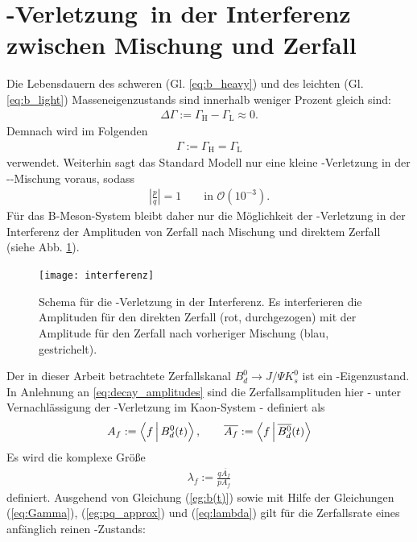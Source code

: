 \section[\CP-Verletzung in der Interferenz zwischen Mischung und Zerfall]{\boldmath\CP-Verletzung\ \unboldmath in der Interferenz zwischen Mischung und Zerfall}
Die Lebensdauern des schweren (Gl. \ref{eq:b_heavy}) und des leichten (Gl. \ref{eq:b_light}) Masseneigenzustands sind innerhalb weniger Prozent gleich sind:
\begin{align}
\Delta \Gamma := \Gamma_{\text{H}} - \Gamma_{\text{L}} \approx 0.
\end{align}
Demnach wird im Folgenden 
\begin{align}
\Gamma := \Gamma_{\text{H}} = \Gamma_{\text{L}} \label{eq:Gamma}
\end{align}
verwendet. Weiterhin sagt das Standard Modell nur eine kleine \CP-Verletzung in der \Bd-\Bdbar-Mischung voraus, sodass
\begin{align}
\left|\frac{p}{q}\right| = 1 \qquad \text{in } \mathcal{O}(10^{-3}). \label{eg:pq_approx}
\end{align}
Für das B-Meson-System bleibt daher nur die Möglichkeit der \CP-Verletzung in der Interferenz der Amplituden von Zerfall nach Mischung und direktem Zerfall (siehe Abb. \ref{fig:interferenz}). 
\begin{figure}[hptb]
\centering
\texttt{[image: interferenz]}
\caption{Schema für die \CP-Verletzung in der Interferenz. Es interferieren die Amplituden für den direkten Zerfall (rot, durchgezogen) mit der Amplitude für den Zerfall nach vorheriger Mischung (blau, gestrichelt).}
\label{fig:interferenz}
\end{figure}
Der in dieser Arbeit betrachtete Zerfallskanal $B_d^0 \rightarrow J/\Psi K_s^0$ ist ein \CP-Eigenzustand. In Anlehnung an \ref{eq:decay_amplitudes} sind die Zerfallsamplituden hier - unter Vernachlässigung der \CP-Verletzung im Kaon-System - definiert als
\begin{align}
\nonumber A_f := \Braket{f|\text{\Bd}(t)\vphantom{\text{\Bdbar}}}, \qquad \overline{A_{f}} := \Braket{f|\text{\Bdbar}(t)}
\end{align}
Es wird die komplexe Größe
\begin{align}
\lambda_f := \frac{q\overline{A_f}}{pA_f} \label{eq:lambda}
\end{align}
definiert. Ausgehend von Gleichung (\ref{eg:b(t)}) sowie mit Hilfe der Gleichungen (\ref{eq:Gamma}), (\ref{eg:pq_approx}) und (\ref{eq:lambda}) gilt für die Zerfallsrate eines anfänglich reinen \Bd-Zustands:
